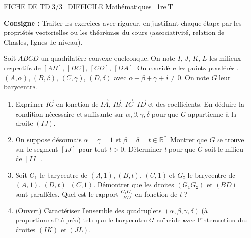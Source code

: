 \documentclass[11pt]{article}
\begin{document}
\begin{tcolorbox}[enhanced,colback=popink,colframe=popink,arc=10pt,boxrule=0pt,left=12pt,right=12pt,top=9pt,bottom=9pt]
{\color{white}\popxbold\small FICHE DE TD 3/3 \textbullet\ DIFFICILE \hfill Mathématiques \textbullet\ 1re T\par}
\end{tcolorbox}
\vspace{4pt}
\noindent \textbf{Consigne :} Traiter les exercices avec rigueur, en justifiant chaque étape par les propriétés vectorielles ou les théorèmes du cours (associativité, relation de Chasles, lignes de niveau).

\begin{exercice}
Soit $ABCD$ un quadrilatère convexe quelconque. On note $I$, $J$, $K$, $L$ les milieux respectifs de $[AB]$, $[BC]$, $[CD]$, $[DA]$. On considère les points pondérés : $(A, \alpha)$, $(B, \beta)$, $(C, \gamma)$, $(D, \delta)$ avec $\alpha+\beta+\gamma+\delta \neq 0$. On note $G$ leur barycentre.
\begin{enumerate}
    \item Exprimer $\overrightarrow{IG}$ en fonction de $\overrightarrow{IA}$, $\overrightarrow{IB}$, $\overrightarrow{IC}$, $\overrightarrow{ID}$ et des coefficients. En déduire la condition nécessaire et suffisante sur $\alpha, \beta, \gamma, \delta$ pour que $G$ appartienne à la droite $(IJ)$.
    \item On suppose désormais $\alpha=\gamma=1$ et $\beta=\delta=t \in \mathbb{R}^*$. Montrer que $G$ se trouve sur le segment $[IJ]$ pour tout $t>0$. Déterminer $t$ pour que $G$ soit le milieu de $[IJ]$.
    \item Soit $G_1$ le barycentre de $(A,1)$, $(B,t)$, $(C,1)$ et $G_2$ le barycentre de $(A,1)$, $(D,t)$, $(C,1)$. Démontrer que les droites $(G_1G_2)$ et $(BD)$ sont parallèles. Quel est le rapport $\frac{G_1G_2}{BD}$ en fonction de $t$ ?
    \item (Ouvert) Caractériser l'ensemble des quadruplets $(\alpha,\beta,\gamma,\delta)$ (à proportionnalité près) tels que le barycentre $G$ coïncide avec l'intersection des droites $(IK)$ et $(JL)$.
\end{enumerate}
\end{exercice}
\end{document}
